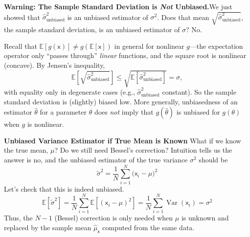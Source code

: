 \begin{warningBox}
    \textbf{Warning: The Sample Standard Deviation is \emph{Not} Unbiased.}\quad We just showed that $\hat{\sigma}^2_{\text{unbiased}}$ is an unbiased estimator of $\sigma^2$. Does that mean $\sqrt{\hat{\sigma}^2_{\text{unbiased}}}$, the sample standard deviation, is an unbiased estimator of $\sigma$? No.

    Recall that $\mathbb{E}[g(\mathsf{x})] \neq g(\mathbb{E}[\mathsf{x}])$ in general for nonlinear $g$---the expectation operator only ``passes through'' \emph{linear} functions, and the square root is nonlinear (concave). By Jensen's inequality,
    \begin{equation}
        \mathbb{E}\!\left[\sqrt{\hat{\sigma}^2_{\text{unbiased}}}\right] \le \sqrt{\mathbb{E}\!\left[\hat{\sigma}^2_{\text{unbiased}}\right]} = \sigma,
    \end{equation}
    with equality only in degenerate cases (e.g., $\hat{\sigma}^2_{\text{unbiased}}$ constant). So the sample standard deviation is (slightly) biased low. More generally, unbiasedness of an estimator $\hat\theta$ for a parameter $\theta$ does \emph{not} imply that $g(\hat\theta)$ is unbiased for $g(\theta)$ when $g$ is nonlinear.
\end{warningBox}

\begin{exampleBox}
    \textbf{Unbiased Variance Estimator if True Mean is Known}
    What if we know the true mean, $\mu$? Do we still need Bessel's correction? Intuition tells us the answer is no, and the unbiased estimator of the true variance $\sigma^2$ should be
    \begin{equation}
        \tilde{\sigma}^2 = \frac{1}{N}\sum_{i=1}^N \bigl(\mathsf{x}_i - \mu\bigr)^2
    \end{equation}
    Let's check that this is indeed unbiased.
    \begin{equation}
        \mathbb{E}\!\left[\tilde{\sigma}^2\right]
        = \frac{1}{N}\sum_{i=1}^N \mathbb{E}\!\left[(\mathsf{x}_i-\mu)^2\right]
        = \frac{1}{N}\sum_{i=1}^N \operatorname{Var}(\mathsf{x}_i)
        = \sigma^2
    \end{equation}
    Thus, the $N-1$ (Bessel) correction is only needed when $\mu$ is unknown and replaced by the sample mean $\hat{\mu}_{\mathsf{x}}$ computed from the same data.

\end{exampleBox}

